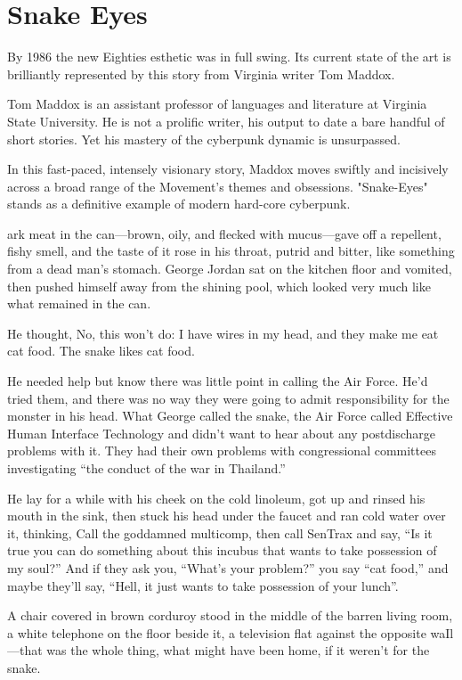 \chapter{Snake Eyes}

By 1986 the new Eighties esthetic was in full swing. Its current state of the art is brilliantly represented by this story from Virginia writer Tom Maddox.

Tom Maddox is an assistant professor of languages and literature at Virginia State University. He is not a prolific writer, his output to date a bare handful of short stories. Yet his mastery of the cyberpunk dynamic is unsurpassed.

In this fast-paced, intensely visionary story, Maddox moves swiftly and incisively across a broad range of the Movement's themes and obsessions. "Snake-Eyes" stands as a definitive example of modern hard-core cyberpunk.

\hrulefill

ark meat in the can—brown, oily, and flecked with mucus—gave off a repellent, fishy smell, and the taste of it rose in his throat, putrid and bitter, like something from a dead man’s stomach. George Jordan sat on the kitchen floor and vomited, then pushed himself away from the shining pool, which looked very much like what remained in the can.

He thought, No, this won’t do: I have wires in my head, and they make me eat cat food. The snake likes cat food.

He needed help but know there was little point in calling the Air Force. He’d tried them, and there was no way they were going to admit responsibility for the monster in his head. What George called the snake, the Air Force called Effective Human Interface Technology and didn’t want to hear about any postdischarge problems with it. They had their own problems with congressional committees investigating “the conduct of the war in Thailand.”

He lay for a while with his cheek on the cold linoleum, got up and rinsed his mouth in the sink, then stuck his head under the faucet and ran cold water over it, thinking, Call the goddamned multicomp, then call SenTrax and say, “Is it true you can do something about this incubus that wants to take possession of my soul?” And if they ask you, “What’s your problem?” you say “cat food,” and maybe they’ll say, “Hell, it just wants to take possession of your lunch”.

A chair covered in brown corduroy stood in the middle of the barren living room, a white telephone on the floor beside it, a television flat against the opposite waIl—that was the whole thing, what might have been home, if it weren’t for the snake.

